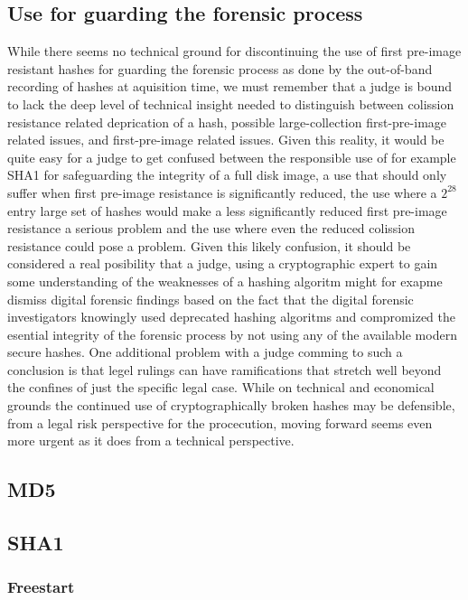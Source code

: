 \subsection{Use for guarding the forensic process}
While there seems no technical ground for discontinuing the use of first pre-image resistant hashes for guarding the forensic process as done by the out-of-band recording of hashes at aquisition time, we must remember that a judge is bound to lack the deep level of technical insight needed to distinguish between colission resistance related deprication of a hash, possible large-collection first-pre-image related issues, and first-pre-image related issues. Given this reality, it would be quite easy for a judge to get confused between the responsible use of for example SHA1 for safeguarding the integrity of a full disk image, a use that should only suffer when first pre-image resistance is significantly reduced, the use where a \(2^{28}\) entry large set of hashes would make a less significantly reduced first pre-image resistance a serious problem and the use where even the reduced colission resistance could pose a problem. Given this likely confusion, it should be considered a real posibility that a judge, using a cryptographic expert to gain some understanding of the weaknesses of a hashing algoritm might for exapme dismiss digital forensic findings based on the fact that the digital forensic investigators knowingly used deprecated hashing algoritms and compromized the esential integrity of the forensic process by not using any of the available modern secure hashes. One additional problem with a judge comming to such a conclusion is that legel rulings can have ramifications that stretch well beyond the confines of just the specific legal case. While on technical and economical grounds the continued use of cryptographically broken hashes may be defensible, from a legal risk perspective for the procecution, moving forward seems even more urgent as it does from a technical perspective. 
\subsection{MD5}

\subsection{SHA1}
\subsubsection{Freestart}
